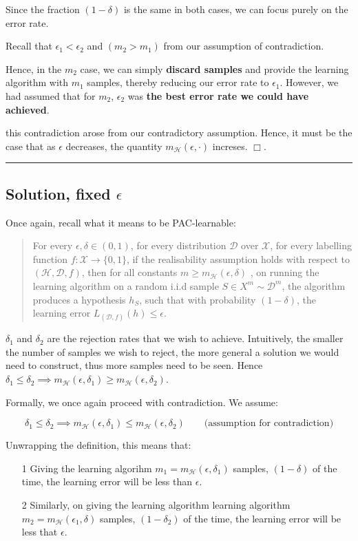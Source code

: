 \documentclass[11pt]{article}
\newcommand{\D}{\ensuremath{\mathcal{D}}}
\renewcommand{\H}{\ensuremath{\mathcal{H}}}
\newcommand{\X}{\ensuremath{\mathcal{X}}}
\def\qed{$\Box$}
\begin{document}
Since the fraction $(1 - \delta)$ is the same in both cases, we can focus
purely on the error rate.

Recall that $\epsilon_1 < \epsilon_2$ and $(m_2 > m_1)$ from our assumption
of contradiction.

Hence, in the $m_2$ case, we can simply \textbf{discard samples} and provide
the learning algorithm with $m_1$ samples, thereby reducing our error
rate to $\epsilon_1$. However, we had assumed that for $m_2$, $\epsilon_2$
was \textbf{the best error rate we could have achieved}.

this contradiction arose from our contradictory assumption. Hence, it
must be the case that as $\epsilon$ decreases, the quantity $m_\H(\epsilon, \cdot)$
increses. \qed.

\rule{\textwidth}{0.1pt}

\subsection*{Solution, fixed $\epsilon$}

Once again, recall what it means to be PAC-learnable:

\begin{quote}
For every $\epsilon, \delta \in (0, 1)$, for every distribution $\D$ over $\X$,
for every labelling function $f: \X \rightarrow \{0, 1\}$, if the realisability
assumption holds with respect to $(\H, \D, f)$, then for all constants
$m \geq m_\H(\epsilon, \delta)$ , on running the learning algorithm on
a random i.i.d sample $S \in X^m \sim \D^m$, the algorithm produces a hypothesis
$h_S$, such that with probability $(1 - \delta)$, the learning error 
$L_{(\D, f)}(h) \leq \epsilon$.
\end{quote}

$\delta_1$ and $\delta_2$ are the rejection rates that we wish to achieve.
Intuitively, the smaller the number of samples we wish to reject, the more
general a solution we would need to construct, thus more samples need to
be seen.
Hence $\delta_1 \leq \delta_2 \implies m_\H(\epsilon, \delta_1) \geq m_\H(\epsilon, \delta_2)$.

Formally, we once again proceed with contradiction. We assume:

$$
\delta_1 \leq \delta_2 \implies m_\H(\epsilon, \delta_1) \leq m_\H(\epsilon, \delta_2) \qquad 
\text{(assumption for contradiction)}
$$

Unwrapping the definition, this means that:
\begin{itemize}
    \item[1] Giving the learning algorihm $m_1 = m_\H(\epsilon, \delta_1)$
        samples,  $(1 - \delta)$ of the time, the learning error will be
        less than $\epsilon$.

    \item[2] Similarly, on giving the learning algorithm learning algorithm
        $m_2 = m_\H(\epsilon_1, \delta)$ samples, $(1 - \delta_2)$ of the
        time, the learning error will be less that $\epsilon$.
\end{itemize}
\end{document}

